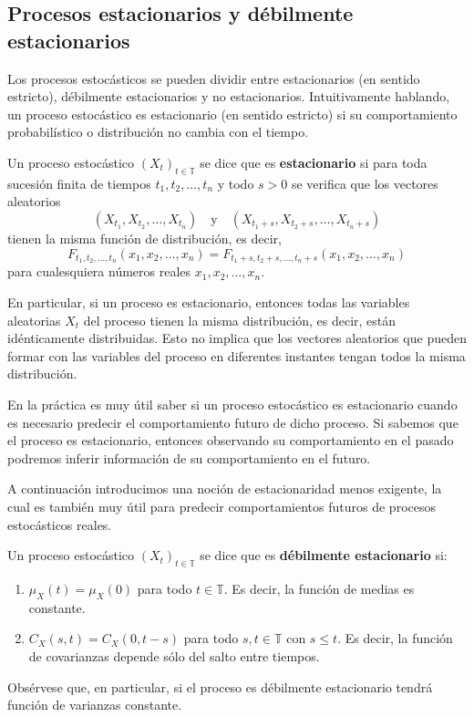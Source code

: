 \subsection{Procesos estacionarios y débilmente estacionarios}
Los procesos estocásticos se pueden dividir entre estacionarios (en sentido estricto), débilmente estacionarios y no estacionarios. Intuitivamente hablando, un proceso estocástico es estacionario (en sentido estricto) si su comportamiento probabilístico o distribución no cambia con el tiempo.
\begin{definition}
    Un proceso estocástico $(X_t)_{t\in \mathbb{T}}$ se dice que es \textbf{estacionario} si para toda sucesión finita de tiempos $t_1,t_2,\dots,t_n$ y todo $s>0$ se verifica que los vectores aleatorios  \[
        (X_{t_1},X_{t_2},\dots,X_{t_n})\quad\text{y}\quad(X_{t_1+s},X_{t_2+s},\dots,X_{t_n+s})
    \]  tienen la misma función de distribución, es decir, \[
    F_{t_1,t_2,\dots,t_n}(x_1,x_2,\dots,x_n)=F_{t_1+s,t_2+s,\dots,t_n+s}(x_1,x_2,\dots,x_n)
    \] para cualesquiera números reales $x_1,x_2,\dots,x_n$.
\end{definition}
En particular, si un proceso es estacionario, entonces todas las variables aleatorias $X_t$ del proceso tienen la misma distribución, es decir, están idénticamente distribuidas. Esto no implica que los vectores aleatorios que pueden formar con las variables del proceso en diferentes instantes tengan todos la misma distribución.

En la práctica es muy útil saber si un proceso estocástico es estacionario cuando es necesario predecir el comportamiento futuro de dicho proceso. Si sabemos que el proceso es estacionario, entonces observando su comportamiento en el pasado podremos inferir información de su comportamiento en el futuro.

A continuación introducimos una noción de estacionaridad menos exigente, la cual es también muy útil para predecir comportamientos futuros de procesos estocásticos reales.
 \begin{definition}
    Un proceso estocástico $(X_t)_{t\in \mathbb{T}}$ se dice que es \textbf{débilmente estacionario} si:
    \begin{enumerate}[label=\arabic*)]
        \item $\mu_X(t)=\mu_X(0)$ para todo $t\in \mathbb{T}$. Es decir, la función de medias es constante.
        \item $C_X(s,t)=C_X(0,t-s)$ para todo  $s,t\in \mathbb{T}$ con $s\le t$. Es decir, la función de covarianzas depende sólo del salto entre tiempos.
    \end{enumerate}
\end{definition}
Obsérvese que, en particular, si el proceso es débilmente estacionario tendrá función de varianzas constante.

